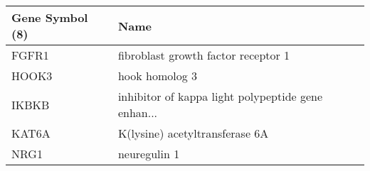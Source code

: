 \begin{tabular}{ll}
\toprule
Gene Symbol (8) &                                               Name \\
\midrule
          FGFR1 &                fibroblast growth factor receptor 1 \\
          HOOK3 &                                     hook homolog 3 \\
          IKBKB & inhibitor of kappa light polypeptide gene enhan... \\
          KAT6A &                     K(lysine) acetyltransferase 6A \\
           NRG1 &                                       neuregulin 1 \\
\bottomrule
\end{tabular}
